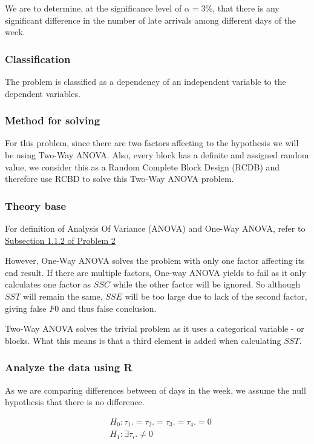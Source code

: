 \documentclass[a4paper]{article}
\numberwithin{equation}{section}
\begin{document}
We are to determine, at the significance level of \( \alpha = 3\% \), that there is any significant difference in the number of late arrivals among different days of the week.

\subsubsection{Classification}
The problem is classified as a dependency of an independent variable to the dependent variables.

\subsubsection{Method for solving}
For this problem, since there are two factors affecting to the hypothesis we will be using Two-Way ANOVA. Also, every block has a definite and assigned random value, we consider this as a Random Complete Block Design (RCDB) and therefore use RCBD to solve this Two-Way ANOVA problem.

\subsubsection{Theory base}

For definition of Analysis Of Variance (ANOVA) and One-Way ANOVA, refer to \hyperref[anovaDef]{\underline{Subsection 1.1.2 of Problem 2}}

However, One-Way ANOVA solves the problem with only one factor affecting its end result. If there are multiple factors, One-way ANOVA yields to fail as it only calculates one factor as \(SSC\) while the other factor will be ignored. So although \(SST\) will remain the same, \(SSE\) will be too large due to lack of the second factor, giving false \(F0\) and thus false conclusion.

Two-Way ANOVA solves the trivial problem as it uses a categorical variable - or blocks. What this means is that a third element is added when calculating \(SST\).

\subsubsection{Analyze the data using R}

As we are comparing differences between of days in the week, we assume the null hypothesis that there is no difference.

\begin{align*}
   & H_0: \tau_1. = \tau_2. = \tau_3. = \tau_4. = 0 \\
   & H_1: \exists\tau_i. \neq 0
\end{align*}
\end{document}
